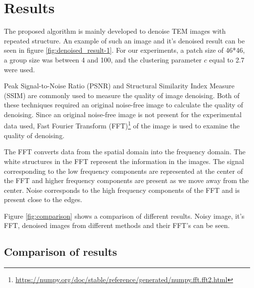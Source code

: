 \documentclass[fleqn,10pt]{wlscirep}
\begin{document}
\section*{Results}

The proposed algorithm is mainly developed to denoise TEM images with repeated structure. An example of such an image and it's denoised result can be seen in figure \ref{fig:denoised_result-1}. For our experiments, a patch size of 46*46, a group size was between 4 and 100, and the clustering parameter $c$ equal to 2.7 were used.

Peak Signal-to-Noise Ratio (PSNR) and Structural Similarity Index Measure (SSIM) are commonly used to measure the quality of image denoising. Both of these techniques required an original noise-free image to calculate the quality of denoising. Since an original noise-free image is not present for the experimental data used, Fast Fourier Transform (FFT)\footnote{\url{https://numpy.org/doc/stable/reference/generated/numpy.fft.fft2.html}} of the image is used to examine the quality of denoising. 

The FFT converts data from the spatial domain into the frequency domain. The white structures in the FFT represent the information in the images. The signal corresponding to the low frequency components are represented at the center of the FFT and higher frequency components are present as we move away from the center. Noise corresponds to the high frequency components of the FFT and is present close to the edges. 

Figure \ref{fig:comparison} shows a comparison of different results. Noisy image, it's FFT, denoised images from different methods and their FFT's can be seen.

\subsection*{Comparison of results}

\label{sec:comparison}
\end{document}
